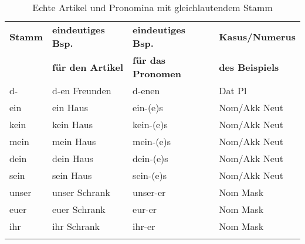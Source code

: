 \begin{table}[!htbp]
  \centering
  \begin{tabular}{llll}
    \lsptoprule
    \textbf{Stamm} & \textbf{eindeutiges Bsp.} & \textbf{eindeutiges Bsp.} & \textbf{Kasus\slash Numerus} \\
    & \textbf{für den Artikel} & \textbf{für das Pronomen} & \textbf{des Beispiels} \\
    \midrule
    d- & d-en Freunden & d-enen & Dat Pl \\
    ein & ein Haus & ein-(e)s & Nom/Akk Neut \\
    kein & kein Haus & kein-(e)s & Nom/Akk Neut \\
    mein & mein Haus & mein-(e)s & Nom/Akk Neut \\
    dein & dein Haus & dein-(e)s & Nom/Akk Neut \\
    sein & sein Haus & sein-(e)s & Nom/Akk Neut \\
    unser & unser Schrank & unser-er & Nom Mask \\
    euer & euer Schrank & eur-er & Nom Mask \\
    ihr & ihr Schrank & ihr-er & Nom Mask \\
    \lspbottomrule
  \end{tabular}
  \caption{Echte Artikel und Pronomina mit gleichlautendem Stamm}
  \label{tab:art}
\end{table}


